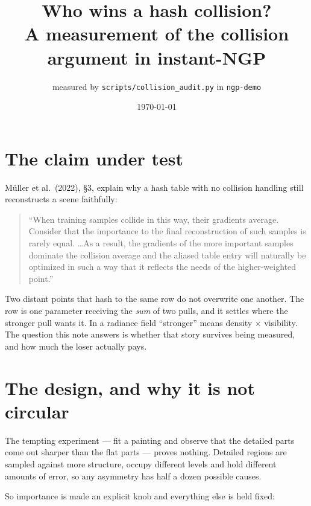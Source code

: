 \documentclass[11pt,a4paper]{article}
\title{\vspace{-1.6cm}Who wins a hash collision?\\[2pt]
\large A measurement of the collision argument in instant-NGP}
\author{\small measured by \texttt{scripts/collision\_audit.py} in \texttt{ngp-demo}}
\date{\small\today}
\begin{document}
\maketitle
\vspace{-0.8cm}

\section*{The claim under test}

M\"uller et al.\ (2022), \S3, explain why a hash table with no collision handling
still reconstructs a scene faithfully:

\begin{quote}\small
``When training samples collide in this way, their gradients average. Consider
that the importance to the final reconstruction of such samples is rarely equal.
\dots As a result, the gradients of the more important samples dominate the
collision average and the aliased table entry will naturally be optimized in such
a way that it reflects the needs of the higher-weighted point.''
\end{quote}

Two distant points that hash to the same row do not overwrite one another. The row
is one parameter receiving the \emph{sum} of two pulls, and it settles where the
stronger pull wants it. In a radiance field ``stronger'' means density $\times$
visibility. The question this note answers is whether that story survives being
measured, and how much the loser actually pays.

\section*{The design, and why it is not circular}

The tempting experiment --- fit a painting and observe that the detailed parts come
out sharper than the flat parts --- proves nothing. Detailed regions are sampled
against more structure, occupy different levels and hold different amounts of
error, so any asymmetry has half a dozen possible causes.

So importance is made an explicit knob and everything else is held fixed:
\end{document}
